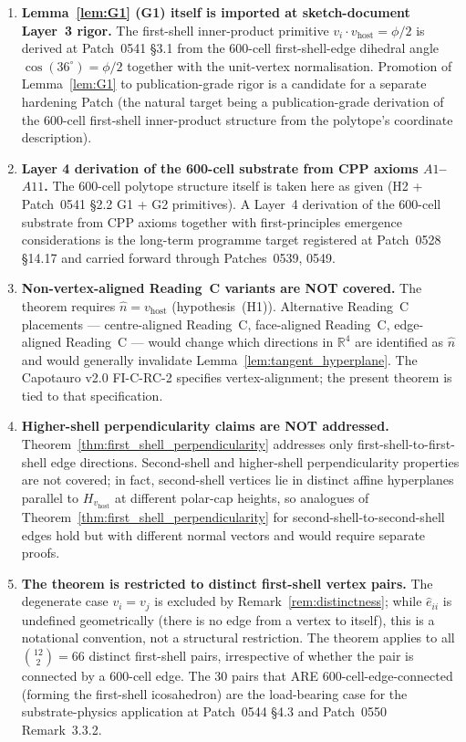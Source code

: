 \documentclass[11pt,letterpaper]{article}
\newcommand{\nhat}{\hat{n}}
\newcommand{\vhost}{v_{\text{host}}}
\newcommand{\Reals}{\mathbb{R}}
\newcommand{\Hperp}{H_{\vhost}}
\begin{document}
\begin{enumerate}[label=\textbf{(E\arabic*)}]
\item \textbf{Lemma~\ref{lem:G1} (G1) itself is imported at sketch-document Layer~3 rigor.} The first-shell inner-product primitive $v_i \cdot \vhost = \phi/2$ is derived at Patch~0541 \S3.1 from the 600-cell first-shell-edge dihedral angle $\cos(36^\circ) = \phi/2$ together with the unit-vertex normalisation. Promotion of Lemma~\ref{lem:G1} to publication-grade rigor is a candidate for a separate hardening Patch (the natural target being a publication-grade derivation of the 600-cell first-shell inner-product structure from the polytope's coordinate description).
\item \textbf{Layer 4 derivation of the 600-cell substrate from CPP axioms $A1$--$A11$.} The 600-cell polytope structure itself is taken here as given (H2 + Patch~0541 \S2.2 G1 + G2 primitives). A Layer~4 derivation of the 600-cell substrate from CPP axioms together with first-principles emergence considerations is the long-term programme target registered at Patch~0528 \S14.17 and carried forward through Patches~0539, 0549.
\item \textbf{Non-vertex-aligned Reading~C variants are NOT covered.} The theorem requires $\nhat = \vhost$ (hypothesis~(H1)). Alternative Reading~C placements --- centre-aligned Reading~C, face-aligned Reading~C, edge-aligned Reading~C --- would change which directions in $\Reals^4$ are identified as $\nhat$ and would generally invalidate Lemma~\ref{lem:tangent_hyperplane}. The Capotauro v2.0 FI-C-RC-2 specifies vertex-alignment; the present theorem is tied to that specification.
\item \textbf{Higher-shell perpendicularity claims are NOT addressed.} Theorem~\ref{thm:first_shell_perpendicularity} addresses only first-shell-to-first-shell edge directions. Second-shell and higher-shell perpendicularity properties are not covered; in fact, second-shell vertices lie in distinct affine hyperplanes parallel to $\Hperp$ at different polar-cap heights, so analogues of Theorem~\ref{thm:first_shell_perpendicularity} for second-shell-to-second-shell edges hold but with different normal vectors and would require separate proofs.
\item \textbf{The theorem is restricted to distinct first-shell vertex pairs.} The degenerate case $v_i = v_j$ is excluded by Remark~\ref{rem:distinctness}; while $\hat{e}_{ii}$ is undefined geometrically (there is no edge from a vertex to itself), this is a notational convention, not a structural restriction. The theorem applies to all $\binom{12}{2} = 66$ distinct first-shell pairs, irrespective of whether the pair is connected by a 600-cell edge. The 30 pairs that ARE 600-cell-edge-connected (forming the first-shell icosahedron) are the load-bearing case for the substrate-physics application at Patch~0544 \S4.3 and Patch~0550 Remark~3.3.2.
\end{enumerate}
\end{document}
